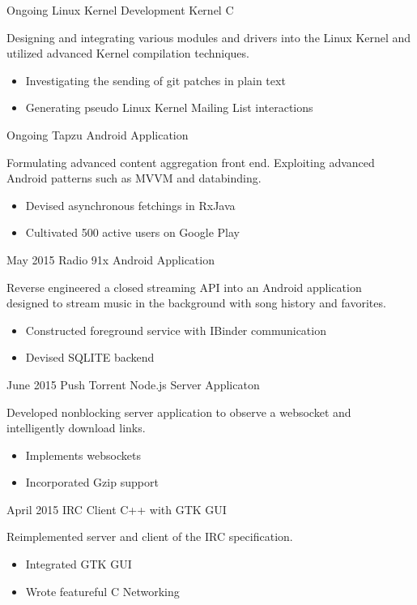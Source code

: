 \documentclass[print]{friggeri-cv} %
\begin{document}
\begin{entrylist}

\entry
{Ongoing}
{Linux Kernel Development}
{Kernel C}
{Designing and integrating various modules and drivers into the Linux Kernel and utilized advanced Kernel compilation techniques.
\begin{itemize}
\item Investigating the sending of git patches in plain text
\item Generating pseudo Linux Kernel Mailing List interactions
\end{itemize}}


\entry
{Ongoing}
{Tapzu}
{Android Application}
{Formulating advanced content aggregation front end. Exploiting advanced\\ Android patterns such as MVVM and databinding.
\begin{itemize}
\item Devised asynchronous fetchings in RxJava
\item Cultivated 500 active users on Google Play
\end{itemize}}


\entry
{May 2015}
{Radio 91x}
{Android Application}
{Reverse engineered a closed streaming API into an Android application\\ designed to stream music in the background with song history and favorites.
\begin{itemize}
\item Constructed foreground service with IBinder communication
\item Devised SQLITE backend
\end{itemize}}



\entry
{June 2015}
{Push Torrent}
{Node.js Server Applicaton}
{Developed nonblocking server application to observe a websocket and\\ intelligently download links.
\begin{itemize}
\item Implements websockets
\item Incorporated Gzip support
\end{itemize}}


\entry
{April 2015}
{IRC Client}
{C++ with GTK GUI}
{Reimplemented server and client of the IRC specification.
\begin{itemize}
\item Integrated GTK GUI
\item Wrote featureful C Networking
\end{itemize}}

\end{entrylist}

\end{document}

